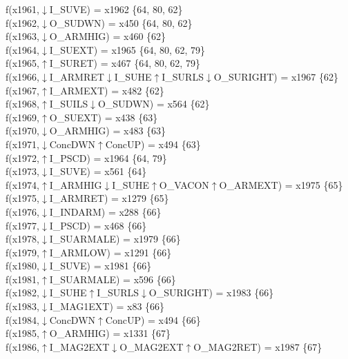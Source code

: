 f(x1961,$\downarrow$I\_SUVE) = x1962 \{64, 80, 62\} \\  
f(x1962,$\downarrow$O\_SUDWN) = x450 \{64, 80, 62\} \\  
f(x1963,$\downarrow$O\_ARMHIG) = x460 \{62\} \\  
f(x1964,$\downarrow$I\_SUEXT) = x1965 \{64, 80, 62, 79\} \\  
f(x1965,$\uparrow$I\_SURET) = x467 \{64, 80, 62, 79\} \\  
f(x1966,$\downarrow$I\_ARMRET$\downarrow$I\_SUHE$\uparrow$I\_SURLS$\downarrow$O\_SURIGHT) = x1967 \{62\} \\  
f(x1967,$\uparrow$I\_ARMEXT) = x482 \{62\} \\  
f(x1968,$\uparrow$I\_SUILS$\downarrow$O\_SUDWN) = x564 \{62\} \\  
f(x1969,$\uparrow$O\_SUEXT) = x438 \{63\} \\  
f(x1970,$\downarrow$O\_ARMHIG) = x483 \{63\} \\  
f(x1971,$\downarrow$ConcDWN$\uparrow$ConcUP) = x494 \{63\} \\  
f(x1972,$\uparrow$I\_PSCD) = x1964 \{64, 79\} \\  
f(x1973,$\downarrow$I\_SUVE) = x561 \{64\} \\  
f(x1974,$\uparrow$I\_ARMHIG$\downarrow$I\_SUHE$\uparrow$O\_VACON$\uparrow$O\_ARMEXT) = x1975 \{65\} \\  
f(x1975,$\downarrow$I\_ARMRET) = x1279 \{65\} \\  
f(x1976,$\downarrow$I\_INDARM) = x288 \{66\} \\  
f(x1977,$\downarrow$I\_PSCD) = x468 \{66\} \\  
f(x1978,$\downarrow$I\_SUARMALE) = x1979 \{66\} \\  
f(x1979,$\uparrow$I\_ARMLOW) = x1291 \{66\} \\  
f(x1980,$\downarrow$I\_SUVE) = x1981 \{66\} \\  
f(x1981,$\uparrow$I\_SUARMALE) = x596 \{66\} \\  
f(x1982,$\downarrow$I\_SUHE$\uparrow$I\_SURLS$\downarrow$O\_SURIGHT) = x1983 \{66\} \\  
f(x1983,$\downarrow$I\_MAG1EXT) = x83 \{66\} \\  
f(x1984,$\downarrow$ConcDWN$\uparrow$ConcUP) = x494 \{66\} \\  
f(x1985,$\uparrow$O\_ARMHIG) = x1331 \{67\} \\  
f(x1986,$\uparrow$I\_MAG2EXT$\downarrow$O\_MAG2EXT$\uparrow$O\_MAG2RET) = x1987 \{67\} \\  
